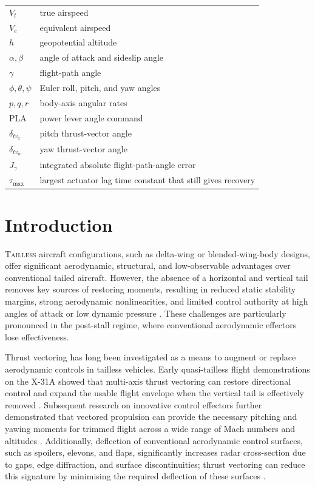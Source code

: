 \documentclass[conf]{new-aiaa}
\renewcommand{\arraystretch}{1.1}
\begin{document}
{\renewcommand\arraystretch{1.0}
\noindent\begin{longtable*}{@{}l @{\quad=\quad} l@{}}
$V_t$ & true airspeed \\
$V_e$ & equivalent airspeed \\
$h$ & geopotential altitude \\
$\alpha,\beta$ & angle of attack and sideslip angle \\
$\gamma$ & flight-path angle \\
$\phi,\theta,\psi$ & Euler roll, pitch, and yaw angles \\
$p,q,r$ & body-axis angular rates \\
PLA & power lever angle command \\
$\delta_{tv_z}$ & pitch thrust-vector angle \\
$\delta_{tv_w}$ & yaw thrust-vector angle \\
$J_\gamma$ & integrated absolute flight-path-angle error \\
$\tau_{\max}$ & largest actuator lag time constant that still gives recovery \\
\end{longtable*}}


\section{Introduction}
\lettrine{T}{ailless} aircraft configurations, such as delta-wing or blended-wing-body designs, offer significant aerodynamic, structural, and low-observable advantages over conventional tailed aircraft. However, the absence of a horizontal and vertical tail removes key sources of restoring moments, resulting in reduced static stability margins, strong aerodynamic nonlinearities, and limited control authority at high angles of attack or low dynamic pressure \cite{HuSongWu2024,ParkChoiJo2017}. These challenges are particularly pronounced in the post-stall regime, where conventional aerodynamic effectors lose effectiveness.

Thrust vectoring has long been investigated as a means to augment or replace aerodynamic controls in tailless vehicles. Early quasi-tailless flight demonstrations on the X-31A showed that multi-axis thrust vectoring can restore directional control and expand the usable flight envelope when the vertical tail is effectively removed \cite{HuberSchellenger1994,BosworthStoliker1996}. Subsequent research on innovative control effectors further demonstrated that vectored propulsion can provide the necessary pitching and yawing moments for trimmed flight across a wide range of Mach numbers and altitudes \cite{Francis2018}. Additionally, deflection of conventional aerodynamic control surfaces, such as spoilers, elevons, and flaps, significantly increases radar cross-section due to gaps, edge diffraction, and surface discontinuities; thrust vectoring can reduce this signature by minimising the required deflection of these surfaces \cite{Zhou2021}.
\end{document}
